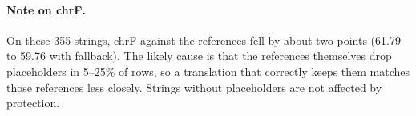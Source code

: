 \paragraph{Note on chrF.} On these 355 strings, chrF against the references fell by about two points (61.79 to 59.76 with
fallback). The likely cause is that the references themselves drop  placeholders in 5--25\% of rows, so a
translation that correctly keeps them matches those references less closely. Strings without placeholders are not
affected by protection.
